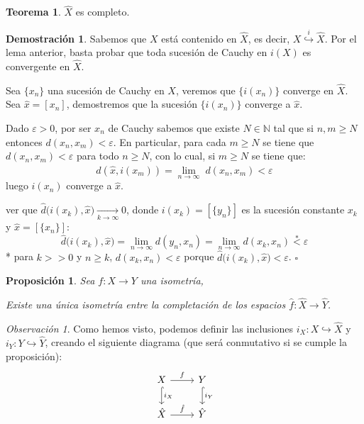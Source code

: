 \documentclass[12pt,twoside]{report}
\theoremstyle{azul}
\theoremstyle{azul2}
\theoremstyle{plain}
\newtheorem*{prop}{Proposición}
\theoremstyle{definition}
\newtheorem*{dem}{Demostración}
\newtheorem*{teo}{Teorema}
\theoremstyle{remark}
\newtheorem*{obs}{Observación}
\providecommand{\Lim}[3]{\underset{#1\to#2}{\lim}\; #3}
\begin{document}
\begin{tcolorbox}
    \begin{teo} $\hat{X}$ es completo.\end{teo}
\end{tcolorbox}
\begin{dem}
Sabemos que $X$ está contenido en $\hat{X}$, es decir, $X \stackrel{i}{\hookrightarrow} \hat{X}$. Por el lema anterior, basta probar que toda sucesión de Cauchy en $i(X)$ es convergente en $\hat{X}$.

Sea $\{x_n\}$ una sucesión de Cauchy en $X$, veremos que $\{i(x_n)\}$ converge en $\hat{X}$. Sea $\hat{x}=[x_n]$, demostremos que la sucesión $\{i(x_n)\}$ converge a $\hat{x}$.

Dado $\varepsilon>0$, por ser $x_n$ de Cauchy sabemos que existe $N\in\mathbb{N}$ tal que si $n,m\geq N$ entonces $d(x_n,x_m)<\varepsilon$. En particular, para cada $m\geq N$ se tiene que $d(x_n,x_m)<\varepsilon$ para todo $n\geq N$, con lo cual, si $m\geq N$ se tiene que:
$$\hat{d}(\hat{x},i(x_m))=\Lim{n}{\infty}{d(x_n,x_m)}<\varepsilon$$
luego $i(x_n)$ converge a $\hat{x}$.

ver que $\hat{d}\big(i(x_k), \hat{x}\big) \underset{k \to \infty}{\longrightarrow}  0$, donde $i(x_k)=[\{y_n\}]$ es la sucesión constante $x_k$ y $\hat{x}=[\{x_n\}]$:
$$\hat{d}\big(i(x_k), \hat{x}\big) = \underset{n \to \infty}{\lim} d(y_n,x_n)=\underset{n \to \infty}{\lim} d(x_k,x_n) \stackrel{*}{<} \varepsilon$$
* para $k >> 0$ y $n \geq k$, $d(x_k,x_n) < \varepsilon$ porque $\hat{d}\big(i(x_k), \hat{x}\big) < \varepsilon$. \hfill $\square$
\end{dem}

\begin{prop}
Sea $f: X \longrightarrow Y$ una isometría,
\vspace{-4mm}\begin{center}
    Existe una {\'u}nica isometría entre la completación de los espacios $\hat{f}: \hat{X} \longrightarrow \hat{Y}$.
\end{center}
\end{prop}

\begin{obs}
Como hemos visto, podemos definir las inclusiones $i_X: X {\hookrightarrow} \hat{X}$ y $i_Y: Y {\hookrightarrow} \hat{Y}$, creando el siguiente diagrama (que será conmutativo si se cumple la proposición):
 $$\begin{tikzcd}
     X  \arrow[hookrightarrow]{d}{i_X} \arrow{r}{f} & Y \arrow[hookrightarrow]{d}{i_Y} \\
     \hat{X} \arrow{r}{\hat{f}} & \hat{Y}
 \end{tikzcd} $$
\end{obs}
\end{document}
